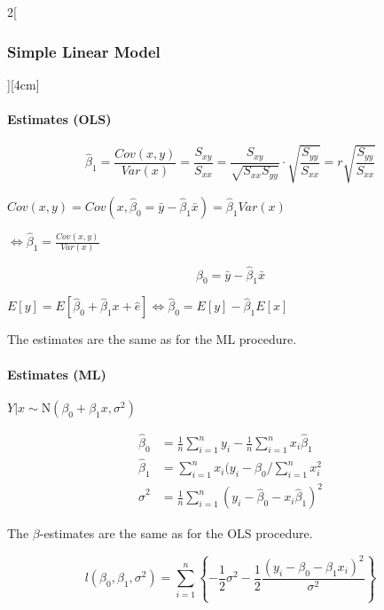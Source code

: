 \documentclass[8pt]{extarticle}
\begin{document}
\begin{multicols}{2}[\subsubsection{Simple Linear Model}][4cm]
\paragraph{Estimates (OLS)}

$$\hat{\beta}_1=\frac{Cov(x,y)}{Var(x)}=\frac{S_{xy}}{S_{xx}}= \frac{S_{xy}}{\sqrt{S_{xx}S_{yy}}} \cdot \sqrt{\frac{S_{yy}}{S_{xx}}}=r\sqrt{\frac{S_{yy}}{S_{xx}}}$$
\begin{Proof}
$Cov(x,y)=Cov(x,\hat{\beta}_0=\bar{y}-\hat{\beta}_1\bar{x})=\hat{\beta}_1Var(x)$

\raggedleft
$ \iff \hat{\beta}_1= \frac{Cov(x,y)}{Var(x)}$
\end{Proof}
$$\hat{\beta}_0=\bar{y}-\hat{\beta}_1\bar{x}$$

\begin{Proof}
$E\left[y\right] = E\left[\hat{\beta}_0+\hat{\beta}_1 x+\hat{e}\right] \iff \hat{\beta}_0 = E\left[y\right] - \hat{\beta}_1E\left[x\right]$
\end{Proof}

The estimates are the same as for the ML procedure.

\paragraph{Estimates (ML)} $Y|x \sim \mathrm{N}(\beta_0 + \beta_1x, \sigma^2)$

\begin{align*}
\hat{\beta}_0 &= \frac{1}{n}\sum_{i=1}^n y_i - \frac{1}{n}\sum_{i=1}^n x_i \hat{\beta}_1\\
\hat{\beta}_1 &=  \sum_{i=1}^n x_i(y_i - \hat{\beta}_0  /\sum_{i=1}^n  x_i^2\\
\hat{\sigma}^2 &= \frac{1}{n}\sum_{i=1}^n (y_i -\hat{\beta}_0 - x_i\hat{\beta}_1)^2
\end{align*}

The $\beta$-estimates are the same as for the OLS procedure.

\begin{Proof}
\vspace{-2em}
$$l(\beta_0, \beta_1,\sigma^2) = \sum_{i=1}^n\left\{-\frac{1}{2} \sigma^2 - \frac{1}{2} \frac{(y_i-\beta_0 -\beta_1x_i)^2}{\sigma^2}\right\}$$
\end{Proof}

\end{multicols}
\end{document}
